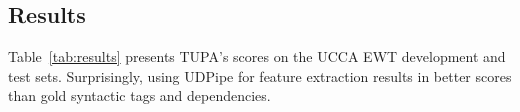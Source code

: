 \documentclass[11pt,a4paper,table]{article}
\begin{document}
\subsection{Results}\label{sec:results}

Table~\ref{tab:results} presents TUPA's scores on the UCCA EWT development
and test sets. Surprisingly, using UDPipe for feature extraction results in
better scores than gold syntactic tags and dependencies.

\begin{table}[h]
\def\arraystretch{.89}
\caption{
Labeled precision, recall and F1 (in~\%) for primary and
remote edges output by TUPA on the UCCA EWT development (top) and test (bottom)
sets, using either gold-standard UD or UDPipe for TUPA features.\label{tab:results}}
\end{table}
\end{document}
